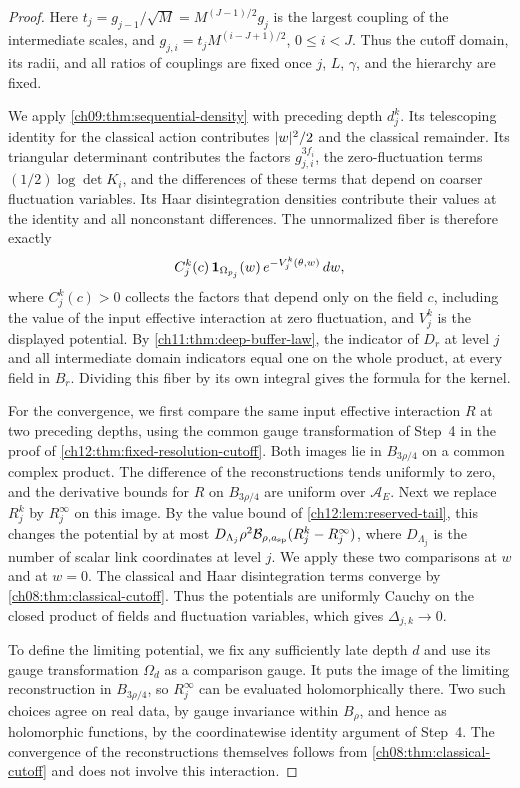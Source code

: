 \begin{proof}
Here $t_j=g_{j-1}/\sqrt M=M^{(J-1)/2}g_j$ is the largest coupling of the intermediate scales, and $g_{j,i}=t_jM^{(i-J+1)/2}$, $0\le i<J$. Thus the cutoff domain, its radii, and all ratios of couplings are fixed once $j$, $L$, $\gamma$, and the hierarchy are fixed.

We apply \cref{ch09:thm:sequential-density} with preceding depth $d_j^k$. Its telescoping identity for the classical action contributes $\lvert w\rvert^2/2$ and the classical remainder. Its triangular determinant contributes the factors $g_{j,i}^{3f_i}$, the zero-fluctuation terms $(1/2)\log\det K_i$, and the differences of these terms that depend on coarser fluctuation variables. Its Haar disintegration densities contribute their values at the identity and all nonconstant differences. The unnormalized fiber is therefore exactly
\[
 C_j^k(c)\,\mathbf 1_{\Omega_{p_j}}(w)\,e^{-V_j^k(\theta,w)}\,dw,
\]
where $C_j^k(c)>0$ collects the factors that depend only on the field $c$, including the value of the input effective interaction at zero fluctuation, and $V_j^k$ is the displayed potential. By \cref{ch11:thm:deep-buffer-law}, the indicator of $D_r$ at level $j$ and all intermediate domain indicators equal one on the whole product, at every field in $B_r$. Dividing this fiber by its own integral gives the formula for the kernel.

For the convergence, we first compare the same input effective interaction $R$ at two preceding depths, using the common gauge transformation of Step~4 in the proof of \cref{ch12:thm:fixed-resolution-cutoff}. Both images lie in $B_{3\rho/4}$ on a common complex product. The difference of the reconstructions tends uniformly to zero, and the derivative bounds for $R$ on $B_{3\rho/4}$ are uniform over $\mathcal A_E$. Next we replace $R_j^k$ by $R_j^\infty$ on this image. By the value bound of \cref{ch12:lem:reserved-tail}, this changes the potential by at most $D_{\Lambda_j}\rho^2\mathcal B_{\rho,a_{\mathrm{sp}}}(R_j^k-R_j^\infty)$, where $D_{\Lambda_j}$ is the number of scalar link coordinates at level $j$. We apply these two comparisons at $w$ and at $w=0$. The classical and Haar disintegration terms converge by \cref{ch08:thm:classical-cutoff}. Thus the potentials are uniformly Cauchy on the closed product of fields and fluctuation variables, which gives $\Delta_{j,k}\to0$.

To define the limiting potential, we fix any sufficiently late depth $d$ and use its gauge transformation $\Omega_d$ as a comparison gauge. It puts the image of the limiting reconstruction in $B_{3\rho/4}$, so $R_j^\infty$ can be evaluated holomorphically there. Two such choices agree on real data, by gauge invariance within $B_\rho$, and hence as holomorphic functions, by the coordinatewise identity argument of Step~4. The convergence of the reconstructions themselves follows from \cref{ch08:thm:classical-cutoff} and does not involve this interaction.


\end{proof}
